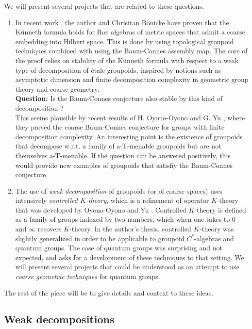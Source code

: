 We will present several projects that are related to these questions. 
\begin{enumerate}
\item In recent work \cite{DelBo18}, the author and Chrisitan B\"onicke have proven that the K\"unneth formula holds for Roe algebras of metric spaces that admit a coarse embedding into Hilbert space. This is done by using topological groupoid techniques combined with using the Baum-Connes assembly map. The core of the proof relies on stability of the K\"unneth formula with respect to a weak type of decomposition of \'etale groupoids, inspired by notions such as asymptotic dimension and finite decomposition complexity in geometric group theory and coarse geometry. \\

\textbf{Question:} Is the Baum-Connes conjecture also stable by this kind of decomposition ?\\

This seems plausible by recent results of H. Oyono-Oyono and G. Yu \cite{OY3}, where they proved the coarse Baum-Connes conjecture for groups with finite decomposition complexity. An interesting point is the existence of groupoids that decompose w.r.t. a family of a-T-menable groupoids but are not themselves a-T-menable. If the question can be answered positively, this would provide new examples of groupoids that satisfiy the Baum-Connes conjecture.     

\item The use of \textit{weak decomposition} of groupoids (or of coarse spaces) uses intensively \textit{controlled $K$-theory}, which is a refinement of operator $K$-theory that was developed by Oyono-Oyono and Yu \cite{OY2}. Controlled $K$-theory is defined as a family of groups indexed by two numbers, which when one takes to $0$ and $\infty$ recovers $K$-theory. In the author's thesis, controlled $K$-theory was slightly generalized in order to be applicable to groupoid $C^*$-algebras and quantum groups. The case of quantum groups was surprising and not expected, and asks for a development of these techniques to that setting. We will present several projects that could be understood as an attempt to use \textit{coarse geometric techniques} for quantum groups.  
\end{enumerate}

The rest of the piece will be to give details and context to these ideas.

\subsection{Weak decompositions}

